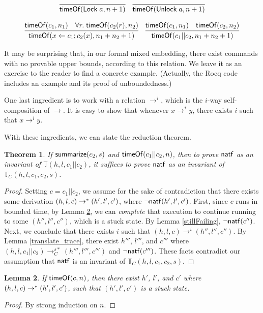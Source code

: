 \documentclass{amsbook}
\newtheorem{theorem}{Theorem}[chapter]
\newtheorem{lemma}[theorem]{Lemma}
\theoremstyle{definition}
\theoremstyle{remark}
\numberwithin{section}{chapter}
\numberwithin{equation}{chapter}
\begin{document}
$$\infer{\tof{\mt{Lock} \; a}{n+1}}{}
\quad \infer{\tof{\mt{Unlock} \; a}{n+1}}{}$$

$$\infer{\tof{x \leftarrow c_1; c_2(x)}{n_1 + n_2 + 1}}{
  \tof{c_1}{n_1}
  & \forall r. \; \tof{c_2(r)}{n_2}
}
\quad \infer{\tof{c_1 || c_2}{n_1 + n_2 + 1}}{
  \tof{c_1}{n_1}
  & \tof{c_2}{n_2}
}$$

It may be surprising that, in our formal mixed embedding, there exist commands with no provable upper bounds, according to this relation.
We leave it as an exercise to the reader to find a concrete example.
(Actually, the Rocq code includes an example and its proof of unboundedness.)

One last ingredient is to work with a relation $\to^i$, which is the $i$-way self-composition of $\to$.
It is easy to show that whenever $x \to^* y$, there exists $i$ such that $x \to^i y$.

\newcommand{\smallstepsC}[3]{#1 \to_C^{#2*} #3}

With these ingredients, we can state the reduction theorem.
\abstraction
\begin{theorem}
  If $\mathsf{summarize}(c_2, s)$ and $\mathsf{timeOf}(c_1 || c_2, n)$, then to prove $\mathsf{natf}$ as an invariant of $\mathbb T(h, l, c_1 || c_2)$, it suffices to prove $\mathsf{natf}$ as an invariant of $\mathbb T_C(h, l, c_1, c_2, s)$.
\end{theorem}
\begin{proof}
  Setting $c = c_1 || c_2$, we assume for the sake of contradiction that there exists some derivation $(h, l, c) \to^* (h', l', c')$, where $\neg \mathsf{natf}(h', l', c')$.
  First, since $c$ runs in bounded time, by Lemma \ref{completion}, we can \emph{complete} that execution to continue running to some $(h'', l'', c'')$, which is a stuck state.
  By Lemma \ref{stillFailing}, $\neg \mathsf{natf}(c'')$.
  Next, we conclude that there exists $i$ such that $(h, l, c) \to^i (h'', l'', c'')$.
  By Lemma \ref{translate_trace}, there exist $h'''$, $l'''$, and $c'''$ where $\smallstepsC{(h, l, c_1 || c_2)}{s}{(h''', l''', c''')}$ and $\neg \mathsf{natf}(c''')$.
  These facts contradict our assumption that $\mathsf{natf}$ is an invariant of $\mathbb T_C(h, l, c_1, c_2, s)$.
\end{proof}

\begin{lemma}\label{completion}
  If $\mathsf{timeOf}(c, n)$, then there exist $h'$, $l'$, and $c'$ where $(h, l, c) \to^* (h', l', c')$, such that $(h', l', c')$ is a stuck state.
\end{lemma}
\begin{proof}
  By strong induction on $n$.
\end{proof}
\end{document}
